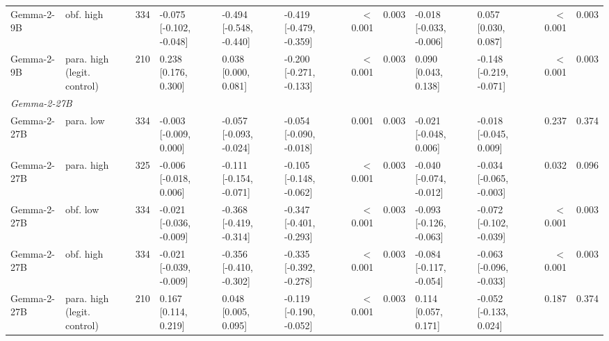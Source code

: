 \begin{tabular}{llrlllrrllrr}
Gemma-2-9B & obf. high & 334 & -0.075 [-0.102, -0.048] & -0.494 [-0.548, -0.440] & -0.419 [-0.479, -0.359] & $<$0.001 & 0.003 & -0.018 [-0.033, -0.006] & 0.057 [0.030, 0.087] & $<$0.001 & 0.003 \\
Gemma-2-9B & para. high (legit. control) & 210 & 0.238 [0.176, 0.300] & 0.038 [0.000, 0.081] & -0.200 [-0.271, -0.133] & $<$0.001 & 0.003 & 0.090 [0.043, 0.138] & -0.148 [-0.219, -0.071] & $<$0.001 & 0.003 \\
\midrule
\multicolumn{12}{l}{\textit{Gemma-2-27B}} \\
Gemma-2-27B & para. low & 334 & -0.003 [-0.009, 0.000] & -0.057 [-0.093, -0.024] & -0.054 [-0.090, -0.018] & 0.001 & 0.003 & -0.021 [-0.048, 0.006] & -0.018 [-0.045, 0.009] & 0.237 & 0.374 \\
Gemma-2-27B & para. high & 325 & -0.006 [-0.018, 0.006] & -0.111 [-0.154, -0.071] & -0.105 [-0.148, -0.062] & $<$0.001 & 0.003 & -0.040 [-0.074, -0.012] & -0.034 [-0.065, -0.003] & 0.032 & 0.096 \\
Gemma-2-27B & obf. low & 334 & -0.021 [-0.036, -0.009] & -0.368 [-0.419, -0.314] & -0.347 [-0.401, -0.293] & $<$0.001 & 0.003 & -0.093 [-0.126, -0.063] & -0.072 [-0.102, -0.039] & $<$0.001 & 0.003 \\
Gemma-2-27B & obf. high & 334 & -0.021 [-0.039, -0.009] & -0.356 [-0.410, -0.302] & -0.335 [-0.392, -0.278] & $<$0.001 & 0.003 & -0.084 [-0.117, -0.054] & -0.063 [-0.096, -0.033] & $<$0.001 & 0.003 \\
Gemma-2-27B & para. high (legit. control) & 210 & 0.167 [0.114, 0.219] & 0.048 [0.005, 0.095] & -0.119 [-0.190, -0.052] & $<$0.001 & 0.003 & 0.114 [0.057, 0.171] & -0.052 [-0.133, 0.024] & 0.187 & 0.374 \\
\bottomrule
\end{tabular}

